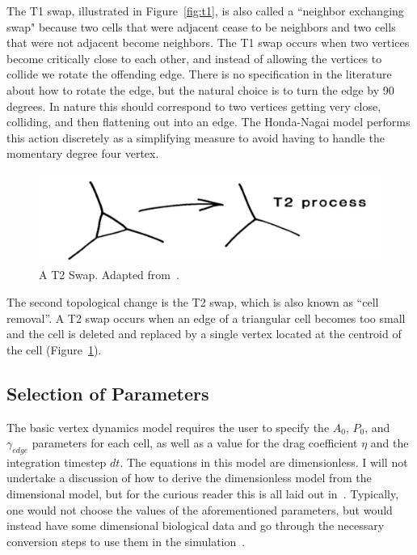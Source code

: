  The T1 swap, illustrated in Figure~\ref{fig:t1}, is also called a ``neighbor exchanging swap" because two cells that were adjacent cease to be neighbors and two cells that were not adjacent become neighbors. The T1 swap occurs when two vertices become critically close to each other, and instead of allowing the vertices to collide we rotate the offending edge. There is no specification in the literature about how to rotate the edge, but the natural choice is to turn the edge by 90 degrees. In nature this should correspond to two vertices getting very close, colliding, and then flattening out into an edge. The Honda-Nagai model performs this action discretely as a simplifying measure to avoid having to handle the momentary degree four vertex.


\begin{figure}
\centering
\includegraphics[width=\textwidth, keepaspectratio]{../diagrams/t2.png}
\caption[A T2 Swap]{A T2 Swap. Adapted from~\cite{Soap}.}
\label{fig:t2}
\end{figure}


The second topological change is the T2 swap, which is also known as ``cell removal''. A T2 swap occurs when an edge of a triangular cell becomes too small and the cell is deleted and replaced by a single vertex located at the centroid of the cell (Figure~\ref{fig:t2}).

\subsection{Selection of Parameters}
The basic vertex dynamics model requires the user to specify the $A_0$, $P_0$, and $\gamma_{edge}$ parameters for each cell, as well as a value for the drag coefficient $\eta$ and the integration timestep $dt$. The equations in this model are dimensionless. I will not undertake a discussion of how to derive the dimensionless model from the dimensional model, but for the curious reader this is all laid out in~\cite{HondaNagai}. Typically, one would not choose the values of the aforementioned parameters, but would instead have some dimensional biological data and go through the necessary conversion steps to use them in the simulation~\cite{NewOkuda}.

